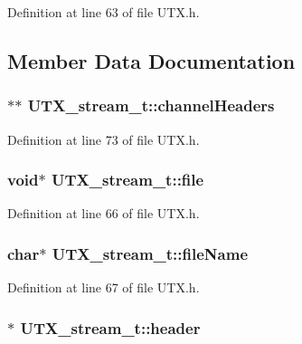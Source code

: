 Definition at line 63 of file UTX.h.

\subsection{Member Data Documentation}
\hypertarget{struct_u_t_x__stream__t_314a808eb2ae10a7d6b27dfe2ad3705d}{
\subsubsection[{channelHeaders}]{$\ast$$\ast$ {\bf UTX\_\-stream\_\-t::channelHeaders}}}
\label{struct_u_t_x__stream__t_314a808eb2ae10a7d6b27dfe2ad3705d}




Definition at line 73 of file UTX.h.\hypertarget{struct_u_t_x__stream__t_6538f0cf9da002661cfb309f52cbbfc9}{
\subsubsection[{file}]{\setlength{\rightskip}{0pt plus 5cm}void$\ast$ {\bf UTX\_\-stream\_\-t::file}}}
\label{struct_u_t_x__stream__t_6538f0cf9da002661cfb309f52cbbfc9}




Definition at line 66 of file UTX.h.\hypertarget{struct_u_t_x__stream__t_31de26d2f8e389e4cd650f9ce503ff53}{
\subsubsection[{fileName}]{\setlength{\rightskip}{0pt plus 5cm}char$\ast$ {\bf UTX\_\-stream\_\-t::fileName}}}
\label{struct_u_t_x__stream__t_31de26d2f8e389e4cd650f9ce503ff53}




Definition at line 67 of file UTX.h.\hypertarget{struct_u_t_x__stream__t_f85ef52373629cd65ea52d928fab8341}{
\subsubsection[{header}]{$\ast$ {\bf UTX\_\-stream\_\-t::header}}}
\label{struct_u_t_x__stream__t_f85ef52373629cd65ea52d928fab8341}




